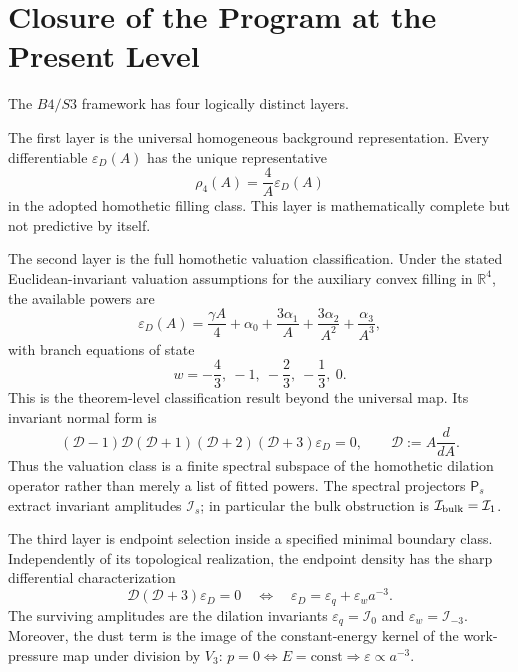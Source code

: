 \documentclass[11pt,a4paper]{article}
\def\Bfour{B4}%
\def\Sthree{S3}%
\def\dd{d}%
\numberwithin{equation}{section}
\theoremstyle{remark}
\newcommand{\Sthree}{S^3}
\newcommand{\Bfour}{B^4}
\newcommand{\Dil}{\mathscr{D}}
\newcommand{\rhoFour}{\rho_4}
\newcommand{\epsD}{\varepsilon_D}
\newcommand{\dd}{\mathrm{d}}
\begin{document}
\section{Closure of the Program at the Present Level}

The \(\Bfour/\Sthree\) framework has four logically distinct layers.

The first layer is the universal homogeneous background representation. Every differentiable \(\epsD(A)\) has the unique representative
\begin{equation}
\rhoFour(A)=\frac{4}{A}\epsD(A)
\end{equation}
in the adopted homothetic filling class. This layer is mathematically complete but not predictive by itself.

The second layer is the full homothetic valuation classification. Under the stated Euclidean-invariant valuation assumptions for the auxiliary convex filling in \(\mathbb{R}^4\), the available powers are
\begin{equation}
\epsD(A)=
\frac{\gamma A}{4}
+\alpha_0+\frac{3\alpha_1}{A}
+\frac{3\alpha_2}{A^2}
+\frac{\alpha_3}{A^3},
\end{equation}
with branch equations of state
\begin{equation}
w=-\frac{4}{3},\ -1,\ -\frac{2}{3},\ -\frac{1}{3},\ 0.
\end{equation}
This is the theorem-level classification result beyond the universal map. Its invariant normal form is
\begin{equation}
(\Dil-1)\Dil(\Dil+1)(\Dil+2)(\Dil+3)\epsD=0,
\qquad
\Dil:=A\frac{\dd}{\dd A}.
\end{equation}
Thus the valuation class is a finite spectral subspace of the homothetic dilation operator rather than merely a list of fitted powers. The spectral projectors \(\mathsf P_s\) extract invariant amplitudes \(\mathcal I_s\); in particular the bulk obstruction is \(\mathcal I_{\rm bulk}=\mathcal I_1\).

The third layer is endpoint selection inside a specified minimal boundary class. Independently of its topological realization, the endpoint density has the sharp differential characterization
\begin{equation}
\Dil(\Dil+3)\epsD=0
\quad\Longleftrightarrow\quad
\epsD=\varepsilon_q+\varepsilon_w a^{-3}.
\end{equation}
The surviving amplitudes are the dilation invariants \(\varepsilon_q=\mathcal I_0\) and \(\varepsilon_w=\mathcal I_{-3}\). Moreover, the dust term is the image of the constant-energy kernel of the work-pressure map under division by \(V_3\): \(p=0\iff E=\mathrm{const}\Rightarrow\varepsilon\propto a^{-3}\).
\end{document}
